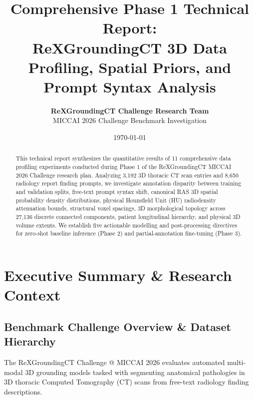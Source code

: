 \documentclass[11pt,a4paper]{article}
\title{\textbf{Comprehensive Phase 1 Technical Report:\\ReXGroundingCT 3D Data Profiling, Spatial Priors, and Prompt Syntax Analysis}}
\author{\textbf{ReXGroundingCT Challenge Research Team}\\
\small MICCAI 2026 Challenge Benchmark Investigation}
\date{\today}
\begin{document}
\maketitle

\begin{abstract}
This technical report synthesizes the quantitative results of 11 comprehensive data profiling experiments conducted during Phase 1 of the ReXGroundingCT MICCAI 2026 Challenge research plan. Analyzing 3,192 3D thoracic CT scan entries and 8,650 radiology report finding prompts, we investigate annotation disparity between training and validation splits, free-text prompt syntax shift, canonical RAS 3D spatial probability density distributions, physical Hounsfield Unit (HU) radiodensity attenuation bounds, structural voxel spacings, 3D morphological topology across 27,136 discrete connected components, patient longitudinal hierarchy, and physical 3D volume extents. We establish five actionable modelling and post-processing directives for zero-shot baseline inference (Phase 2) and partial-annotation fine-tuning (Phase 3).
\end{abstract}

\tableofcontents
\newpage

\section{Executive Summary \& Research Context}

\subsection{Benchmark Challenge Overview \& Dataset Hierarchy}
The ReXGroundingCT Challenge @ MICCAI 2026 evaluates automated multi-modal 3D grounding models tasked with segmenting anatomical pathologies in 3D thoracic Computed Tomography (CT) scans from free-text radiology finding descriptions. 
\end{document}
